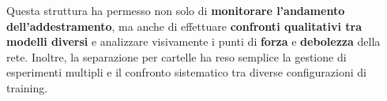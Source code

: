 Questa struttura ha permesso non solo di \textbf{monitorare l’andamento dell’addestramento}, ma anche di effettuare \textbf{confronti qualitativi tra modelli diversi} e analizzare visivamente i punti di \textbf{forza} e \textbf{debolezza} della rete. Inoltre, la separazione per cartelle ha reso semplice la gestione di esperimenti multipli e il confronto sistematico tra diverse configurazioni di training.